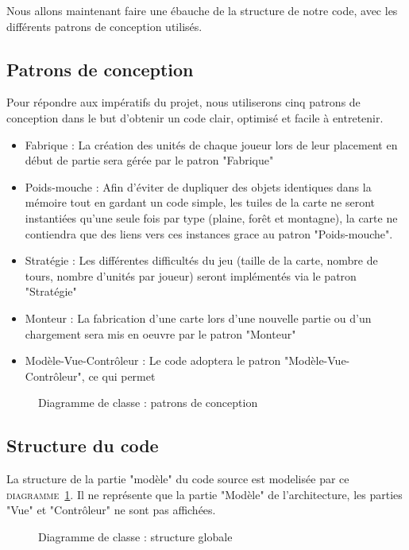Nous allons maintenant faire une ébauche de la structure de notre code, avec les différents patrons de conception utilisés.

\subsection{Patrons de conception}

Pour répondre aux impératifs du projet, nous utiliserons cinq patrons de conception dans le but d'obtenir un code clair, optimisé et facile à entretenir. 

\begin{itemize}
  \item Fabrique : La création des unités de chaque joueur lors de leur placement en début de partie sera gérée par le patron "Fabrique"
  \item Poids-mouche : Afin d'éviter de dupliquer des objets identiques dans la mémoire tout en gardant un code simple, les tuiles de la carte ne seront instantiées qu'une seule fois par type (plaine, forêt et montagne), la carte ne contiendra que des liens vers ces instances grace au patron "Poids-mouche".
  \item Stratégie : Les différentes difficultés du jeu (taille de la carte, nombre de tours, nombre d'unités par joueur) seront implémentés via le patron "Stratégie"
  \item Monteur : La fabrication d'une carte lors d'une nouvelle partie ou d'un chargement sera mis en oeuvre par le patron "Monteur"
  \item Modèle-Vue-Contrôleur : Le code adoptera le patron "Modèle-Vue-Contrôleur", ce qui permet
\end{itemize}

\begin{figure}[!h]
\centering
\caption{Diagramme de classe : patrons de conception}
\end{figure}

\subsection{Structure du code}

La structure de la partie "modèle" du code source est modelisée par ce \textsc{diagramme~\ref{structure}}. Il ne représente que la partie "Modèle" de l'architecture, les parties "Vue" et "Contrôleur" ne sont pas affichées.

\begin{figure}[!h]
\centering
\label{structure}
\caption{Diagramme de classe : structure globale}
\end{figure}



